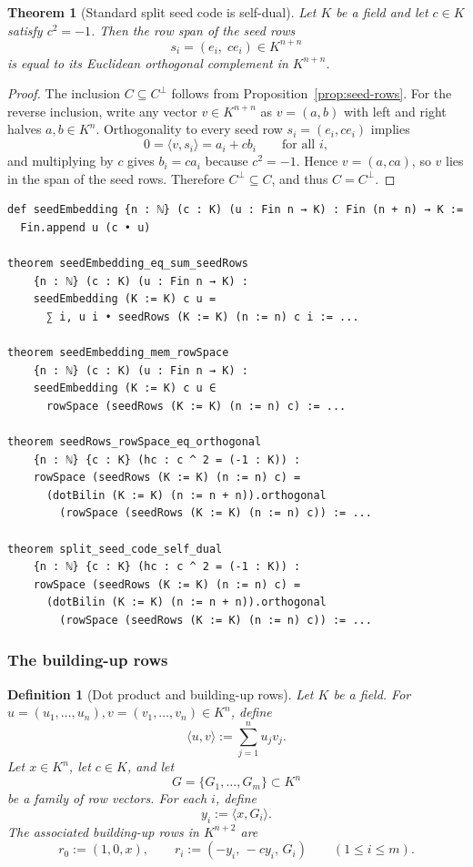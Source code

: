 \documentclass[12pt]{article}
\newtheorem{defn}{Definition}[section]
\newtheorem{theorem}{Theorem}[section]
\begin{document}
\begin{theorem}[Standard split seed code is self-dual]
\label{thm:split-seed-self-dual}
Let $K$ be a field and let $c\in K$ satisfy $c^2=-1$. Then the row span of the seed rows
\[
s_i=(e_i,\; c e_i)\in K^{n+n}
\]
is equal to its Euclidean orthogonal complement in $K^{n+n}$.
\end{theorem}

\begin{proof}
The inclusion $C\subseteq C^\perp$ follows from Proposition~\ref{prop:seed-rows}. For the reverse inclusion, write any vector $v\in K^{n+n}$ as $v=(a,b)$ with left and right halves $a,b\in K^n$. Orthogonality to every seed row $s_i=(e_i,ce_i)$ implies
\[
0=\langle v,s_i\rangle = a_i + c b_i
\qquad\text{for all }i,
\]
and multiplying by $c$ gives $b_i = c a_i$ because $c^2=-1$. Hence $v=(a,ca)$, so $v$ lies in the span of the seed rows. Therefore $C^\perp\subseteq C$, and thus $C=C^\perp$.
\end{proof}

\begin{lstlisting}[caption={Lean verification for Theorem~\ref{thm:split-seed-self-dual}.}]
def seedEmbedding {n : ℕ} (c : K) (u : Fin n → K) : Fin (n + n) → K :=
  Fin.append u (c • u)

theorem seedEmbedding_eq_sum_seedRows
    {n : ℕ} (c : K) (u : Fin n → K) :
    seedEmbedding (K := K) c u =
      ∑ i, u i • seedRows (K := K) (n := n) c i := ...

theorem seedEmbedding_mem_rowSpace
    {n : ℕ} (c : K) (u : Fin n → K) :
    seedEmbedding (K := K) c u ∈
      rowSpace (seedRows (K := K) (n := n) c) := ...

theorem seedRows_rowSpace_eq_orthogonal
    {n : ℕ} {c : K} (hc : c ^ 2 = (-1 : K)) :
    rowSpace (seedRows (K := K) (n := n) c) =
      (dotBilin (K := K) (n := n + n)).orthogonal
        (rowSpace (seedRows (K := K) (n := n) c)) := ...

theorem split_seed_code_self_dual
    {n : ℕ} {c : K} (hc : c ^ 2 = (-1 : K)) :
    rowSpace (seedRows (K := K) (n := n) c) =
      (dotBilin (K := K) (n := n + n)).orthogonal
        (rowSpace (seedRows (K := K) (n := n) c)) := ...
\end{lstlisting}

\subsubsection{The building-up rows}

\begin{defn}[Dot product and building-up rows]
\label{def:buildrows}
Let $K$ be a field. For $u=(u_1,\dots,u_n), v=(v_1,\dots,v_n)\in K^n$, define
\[
\langle u,v\rangle := \sum_{j=1}^n u_j v_j.
\]
Let $x\in K^n$, let $c\in K$, and let
\[
G=\{G_1,\dots,G_m\}\subset K^n
\]
be a family of row vectors. For each $i$, define
\[
y_i := \langle x,G_i\rangle.
\]
The associated building-up rows in $K^{n+2}$ are
\[
r_0 := (1,0,x),
\qquad
r_i := (-y_i,\,-c y_i,\,G_i)
\qquad (1\le i\le m).
\]
\end{defn}
\end{document}

